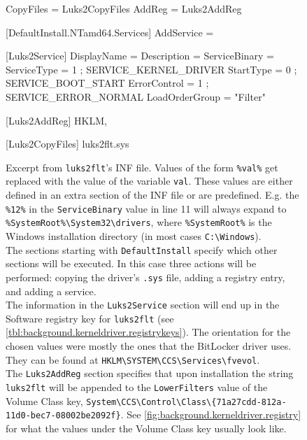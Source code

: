 \begin{figure}[htb!]
	\begin{inicode}
CopyFiles = Luks2CopyFiles
AddReg    = Luks2AddReg

[DefaultInstall.NTamd64.Services]
AddService = %

[Luks2Service]
DisplayName    = %
Description    = %
ServiceBinary  = %
ServiceType    = 1 ; SERVICE_KERNEL_DRIVER
StartType      = 0 ; SERVICE_BOOT_START
ErrorControl   = 1 ; SERVICE_ERROR_NORMAL
LoadOrderGroup = "Filter"

[Luks2AddReg]
HKLM,%

[Luks2CopyFiles]
luks2flt.sys
	\end{inicode}
	\caption[
		Excerpt from \texttt{luks2flt}'s INF file
	]{
		Excerpt from \texttt{luks2flt}'s INF file. Values of the form \texttt{\%val\%} get replaced with the value of the variable \texttt{val}. These values are either defined in an extra section of the INF file or are predefined. E.g. the \texttt{\%12\%} in the \texttt{ServiceBinary} value in line 11 will always expand to \texttt{\%SystemRoot\%\textbackslash System32\textbackslash drivers}, where \texttt{\%SystemRoot\%} is the Windows installation directory (in most cases \texttt{C:\textbackslash Windows}).\\
		The sections starting with \texttt{DefaultInstall} specify which other sections will be executed. In this case three actions will be performed: copying the driver's \texttt{.sys} file, adding a registry entry, and adding a service.\\
		The information in the \texttt{Luks2Service} section will end up in the Software registry key for \texttt{luks2flt} (see \autoref{tbl:background.kerneldriver.registrykeys}). The orientation for the chosen values were mostly the ones that the BitLocker driver uses. They can be found at \texttt{HKLM\textbackslash SYSTEM\textbackslash CCS\textbackslash Services\textbackslash fvevol}.\\
		The \texttt{Luks2AddReg} section specifies that upon installation the string \texttt{luks2flt} will be appended to the \texttt{LowerFilters} value of the Volume Class key, \texttt{System\textbackslash CCS\textbackslash Control\textbackslash Class\textbackslash \{71a27cdd-812a-11d0-bec7-08002be2092f\}}. See \autoref{fig:background.kerneldriver.registry} for what the values under the Volume Class key usually look like.
	}
	\label{fig:ourapproach.final.luks2fltini}
\end{figure}

